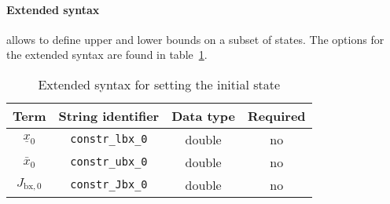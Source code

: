 \documentclass[english]{article}
\newcommand{\code}[1]{\texttt{#1}}
\newcommand{\optional}{no}
\begin{document}
\paragraph{Extended syntax}
allows to define upper and lower bounds on a subset of states.
The options for the extended syntax are found in table~\ref{tab:constraints:extendedsyntax}.
\begin{table}[h!]
    \centering
    \caption{Extended syntax for setting the initial state} \label{tab:constraints:extendedsyntax}
    \begin{tabular}{cccc}
        \toprule
        Term & String identifier & Data type & Required \\ \midrule
        $ \underline{x}_0 $ & \code{constr\_lbx\_0} & double & \optional \\
        $ \bar{x}_0 $ & \code{constr\_ubx\_0} & double & \optional \\
        $ J_{\textrm{bx},0} $ & \code{constr\_Jbx\_0} & double & \optional \\
        \bottomrule
    \end{tabular}
\end{table}
%
\end{document}
